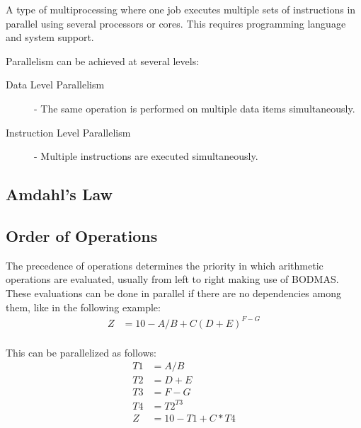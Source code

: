 \documentclass[12pt letter]{report}
\begin{document}
A type of multiprocessing where one job executes multiple sets of
instructions in parallel using several processors or cores. This
requires programming language and system support.

Parallelism can be achieved at several levels:
\begin{description}
  \item[Data Level Parallelism] - The same operation is performed on
    multiple data items simultaneously.
  \item[Instruction Level Parallelism] - Multiple instructions are executed
    simultaneously.
\end{description}

\subsection{Amdahl's Law}


\subsection{Order of Operations}

The precedence of operations determines the priority in which
arithmetic operations are evaluated, usually from left to right
making use of BODMAS. These evaluations can be done in parallel if there are
no dependencies among them, like in the following example:
\begin{align*}
  Z &= 10 - A / B + C (D + E)^{F - G} \\
\end{align*}

This can be parallelized as follows:
\begin{align*}
  T1 &= A / B \\
  T2 &= D + E \\
  T3 &= F - G \\
  T4 &= T2^{T3} \\
  Z &= 10 - T1 + C * T4 \\
\end{align*}
\end{document}
